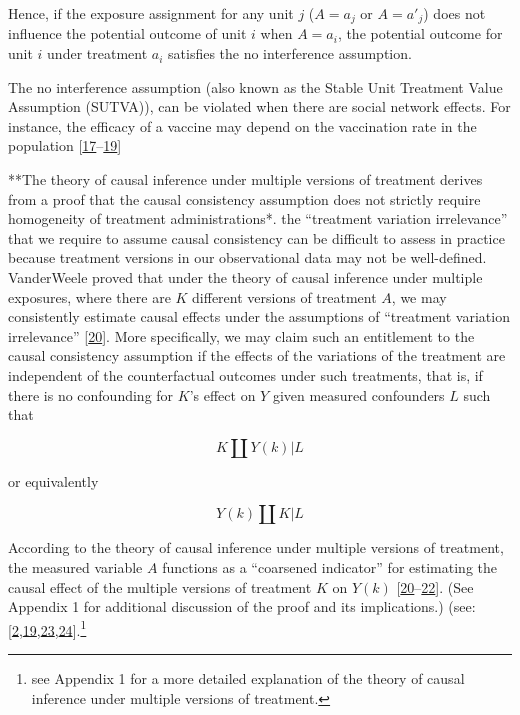 \documentclass[
  singlecolumn]{article}
\begin{document}
Hence, if the exposure assignment for any unit \(j\) (\(A=a_j\) or
\(A=a'_j\)) does not influence the potential outcome of unit \(i\) when
\(A=a_i\), the potential outcome for unit \(i\) under treatment \(a_i\)
satisfies the no interference assumption.

The no interference assumption (also known as the Stable Unit Treatment
Value Assumption (SUTVA)), can be violated when there are social network
effects. For instance, the efficacy of a vaccine may depend on the
vaccination rate in the population
{[}\protect\hyperlink{ref-ogburn2022}{17}--\protect\hyperlink{ref-murray2021a}{19}{]}

**The theory of causal inference under multiple versions of treatment
derives from a proof that the causal consistency assumption does not
strictly require homogeneity of treatment administrations*. the
``treatment variation irrelevance'' that we require to assume causal
consistency can be difficult to assess in practice because treatment
versions in our observational data may not be well-defined. VanderWeele
proved that under the theory of causal inference under multiple
exposures, where there are \(K\) different versions of treatment \(A\),
we may consistently estimate causal effects under the assumptions of
``treatment variation irrelevance''
{[}\protect\hyperlink{ref-vanderweele2009}{20}{]}. More specifically, we
may claim such an entitlement to the causal consistency assumption if
the effects of the variations of the treatment are independent of the
counterfactual outcomes under such treatments, that is, if there is no
confounding for \(K\)'s effect on \(Y\) given measured confounders \(L\)
such that

\[
K \coprod Y(k) | L
\]

or equivalently

\[
Y(k) \coprod K | L
\]

According to the theory of causal inference under multiple versions of
treatment, the measured variable \(A\) functions as a ``coarsened
indicator'' for estimating the causal effect of the multiple versions of
treatment \(K\) on \(Y(k)\)
{[}\protect\hyperlink{ref-vanderweele2009}{20}--\protect\hyperlink{ref-vanderweele2018}{22}{]}.
(See Appendix 1 for additional discussion of the proof and its
implications.) (see:
{[}\protect\hyperlink{ref-bulbulia2022}{2},\protect\hyperlink{ref-murray2021a}{19},\protect\hyperlink{ref-hernuxe1n2022a}{23},\protect\hyperlink{ref-hernuxe1n2008}{24}{]}.\footnote{see
  Appendix 1 for a more detailed explanation of the theory of causal
  inference under multiple versions of treatment.}
\end{document}
